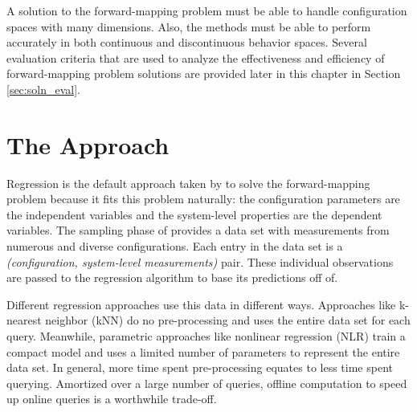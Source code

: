 A solution to the forward-mapping problem must be able to handle configuration spaces with many dimensions.
Also, the methods must be able to perform accurately in both continuous and discontinuous behavior spaces.
Several evaluation criteria that are used to analyze the effectiveness and efficiency of forward-mapping problem solutions are provided later in this chapter in Section \ref{sec:soln_eval}.


\section{The \fw Approach}

Regression is the default approach taken by \fw to solve the forward-mapping problem because
it fits this problem naturally: the configuration parameters are the independent variables and the system-level properties are the dependent variables.
The sampling phase of \fw provides a data set with measurements from numerous and diverse configurations.
Each entry in the data set is a \textit{(configuration, system-level measurements)} pair.
These individual observations are passed to the regression algorithm to base its predictions off of.

Different regression approaches use this data in different ways.
Approaches like k-nearest neighbor (kNN) do no pre-processing and uses the entire data set for each query.
Meanwhile, parametric approaches like nonlinear regression (NLR) train a compact model and uses a limited number of parameters to represent the entire data set.
In general, more time spent pre-processing equates to less time spent querying.
Amortized over a large number of queries, offline computation to speed up online queries is a worthwhile trade-off.

